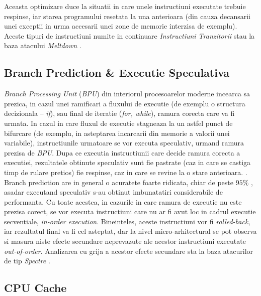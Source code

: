 Aceasta optimizare duce la situatii in care unele instructiuni executate
trebuie respinse, iar starea programului resetata la una anterioara (din cauza
decansarii unei exceptii in urma accesarii unei zone de memorie interzisa de
exemplu). Aceste tipuri de instructiuni numite in continuare \emph{Instructiuni
Tranzitorii} stau la baza atacului \emph{Meltdown} \cite{meltdown2018}.


\subsection{Branch Prediction \& Executie Speculativa}
\label{sec:branch_prediction}

\emph{Branch Processing Unit} (\emph{BPU}) din interiorul procesoarelor moderne
incearca sa prezica, in cazul unei ramificari a fluxului de executie (de
exemplu o structura decizionala -- \emph{if}), sau final de iteratie
(\emph{for, while}), ramura corecta care va fi urmata. In cazul in care fluxul
de executie stagneaza la un astfel punct de bifurcare (de exemplu, in
asteptarea incarcarii din memorie a valorii unei variabile), instructiunile
urmatoare se vor executa speculativ, urmand ramura prezisa de \emph{BPU}. Dupa
ce executia instructiunii care decide ramura corecta a executiei, rezultatele
obtinute speculativ sunt fie pastrate (caz in care se castiga timp de rulare pretios) fie respinse, caz in care se revine la o stare anterioara. \cite{spectre2019}. \\

Branch prediction are in general o acuratete foarte ridicata, chiar de peste
$95\%$ \cite{what_is_speculative_execution}, asadar executand speculativ s-au
obtinut imbunatatiri considerabile de performanta. Cu toate acestea, in
cazurile in care ramura de executie nu este prezisa corect, se vor executa
instructiuni care nu ar fi avut loc in cadrul executie secventiale,
\emph{in-order execution}. Bineinteles, aceste instructiuni vor fi
\emph{rolled-back}, iar rezultatul final va fi cel asteptat, dar la nivel
micro-arhitectural se pot observa si masura niste efecte secundare neprevazute
ale acestor instructiuni executate \emph{out-of-order}. Analizarea cu grija a
acestor efecte secundare sta la baza atacurilor de tip \emph{Spectre}
\cite{spectre2019}.

\subsection{CPU Cache}

